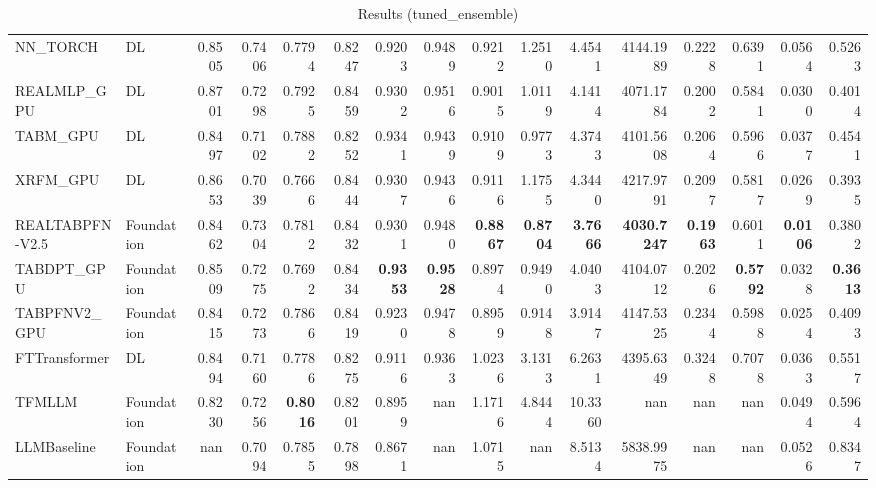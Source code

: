 \begin{table}[htbp]
{\begin{tabular}{ll|rrrrrrrrrrrrrr}
NN\_TORCH & DL & 0.8505 & 0.7406 & 0.7794 & 0.8247 & 0.9203 & 0.9489 & 0.9212 & 1.2510 & 4.4541 & 4144.1989 & 0.2228 & 0.6391 & 0.0564 & 0.5263 \\
REALMLP\_GPU & DL & 0.8701 & 0.7298 & 0.7925 & 0.8459 & 0.9302 & 0.9516 & 0.9015 & 1.0119 & 4.1414 & 4071.1784 & 0.2002 & 0.5841 & 0.0300 & 0.4014 \\
TABM\_GPU & DL & 0.8497 & 0.7102 & 0.7882 & 0.8252 & 0.9341 & 0.9439 & 0.9109 & 0.9773 & 4.3743 & 4101.5608 & 0.2064 & 0.5966 & 0.0377 & 0.4541 \\
XRFM\_GPU & DL & 0.8653 & 0.7039 & 0.7666 & 0.8444 & 0.9307 & 0.9436 & 0.9116 & 1.1755 & 4.3440 & 4217.9791 & 0.2097 & 0.5817 & 0.0269 & 0.3935 \\
REALTABPFN-V2.5 & Foundation & 0.8462 & 0.7304 & 0.7812 & 0.8432 & 0.9301 & 0.9480 & \textbf{0.8867} & \textbf{0.8704} & \textbf{3.7666} & \textbf{4030.7247} & \textbf{0.1963} & 0.6011 & \textbf{0.0106} & 0.3802 \\
TABDPT\_GPU & Foundation & 0.8509 & 0.7275 & 0.7692 & 0.8434 & \textbf{0.9353} & \textbf{0.9528} & 0.8974 & 0.9490 & 4.0403 & 4104.0712 & 0.2026 & \textbf{0.5792} & 0.0328 & \textbf{0.3613} \\
TABPFNV2\_GPU & Foundation & 0.8415 & 0.7273 & 0.7866 & 0.8419 & 0.9230 & 0.9478 & 0.8959 & 0.9148 & 3.9147 & 4147.5325 & 0.2344 & 0.5988 & 0.0254 & 0.4093 \\
\midrule
FTTransformer & DL & 0.8494 & 0.7160 & 0.7786 & 0.8275 & 0.9116 & 0.9363 & 1.0236 & 3.1313 & 6.2631 & 4395.6349 & 0.3248 & 0.7078 & 0.0363 & 0.5517 \\
TFMLLM & Foundation & 0.8230 & 0.7256 & \textbf{0.8016} & 0.8201 & 0.8959 & nan & 1.1716 & 4.8444 & 10.3360 & nan & nan & nan & 0.0494 & 0.5964 \\
LLMBaseline & Foundation & nan & 0.7094 & 0.7855 & 0.7898 & 0.8671 & nan & 1.0715 & nan & 8.5134 & 5838.9975 & nan & nan & 0.0526 & 0.8347 \\
\bottomrule
\end{tabular}
}
\caption{Results (tuned_ensemble)}
\label{tab:results_tuned_ensemble}
\end{table}